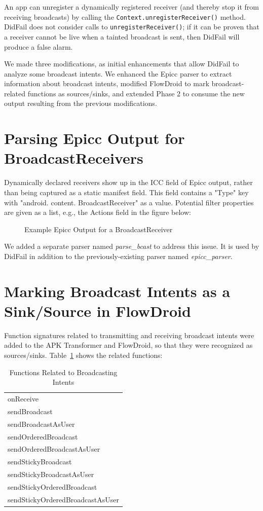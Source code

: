 An app can unregister a dynamically registered receiver (and thereby stop it from receiving broadcasts) by calling the \texttt{Context.unregisterReceiver()} method.  DidFail does not consider calls to \texttt{unregisterReceiver()}; if it can be proven that a receiver cannot be live when a tainted broadcast is sent, then DidFail will produce a false alarm.

We made three modifications, as initial enhancements that allow DidFail to analyze some broadcast intents. We enhanced the Epicc parser to extract information about broadcast intents, modified FlowDroid to mark broadcast-related functions as sources/sinks, and extended Phase 2 to consume the new output resulting from the previous modifications.

\section{Parsing Epicc Output for BroadcastReceivers}
Dynamically declared receivers show up in the ICC field of Epicc output, rather than being captured as a static manifest field.   This field contains a "Type" key with "android. content. BroadcastReceiver" as a value.  Potential filter properties are given as a list, e.g., the Actions field in the figure below:

\begin{figure}[!h]
\begin{framed}

\caption{Example Epicc Output for a BroadcastReceiver}
\end{framed}
\end{figure}

We added a separate parser named \emph{parse\_bcast} to address this issue. It is used by DidFail in addition to the previously-existing parser named \emph{epicc\_parser}.

\section{Marking Broadcast Intents as a Sink/Source in FlowDroid}
Function signatures related to transmitting and receiving broadcast intents were added to the APK Transformer and FlowDroid, so that they were recognized as sources/sinks. Table~\ref{fnc_bcast} shows the related functions:
\begin{table}[!h]
\renewcommand{\arraystretch}{1.3}
\caption{Functions Related to Broadcasting Intents}
\label{fnc_bcast}
\centering
\begin{tabular}{l}
\hline
onReceive \\
sendBroadcast \\
sendBroadcastAsUser \\
sendOrderedBroadcast \\
sendOrderedBroadcastAsUser \\
sendStickyBroadcast \\
sendStickyBroadcastAsUser \\
sendStickyOrderedBroadcast \\
sendStickyOrderedBroadcastAsUser \\
\hline
\end{tabular}
\end{table}

